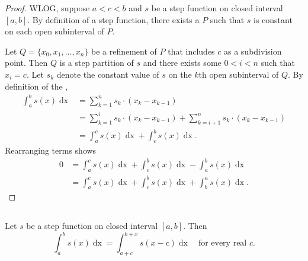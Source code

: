 \documentclass{report}
\begin{document}
  \begin{proof}
    WLOG, suppose $a < c < b$ and $s$ be a step function on closed interval
      $[a, b]$.
    By definition of a step function, there exists a 
      $P$ such that $s$ is constant on each open subinterval of $P$.

    Let $Q = \{x_0, x_1, \ldots, x_n\}$ be a refinement of $P$ that includes $c$
      as a subdivision point.
    Then $Q$ is a step partition of $s$ and there exists some $0 < i < n$ such
      that $x_i = c$.
    Let $s_k$ denote the constant value of $s$ on the $k$th open subinterval of
      $Q$.
    By definition of the ,
      \begin{align*}
        \int_a^b s(x) \mathop{dx}
          & = \sum_{k=1}^n s_k \cdot (x_k - x_{k - 1}) \\
          & = \sum_{k=1}^i s_k \cdot (x_k - x_{k - 1}) +
              \sum_{k=i+1}^n s_k \cdot (x_k - x_{k - 1}) \\
          & = \int_a^c s(x) \mathop{dx} + \int_c^b s(x) \mathop{dx}.
      \end{align*}
    Rearranging terms shows
      \begin{align*}
        0
          & = \int_a^c s(x) \mathop{dx} + \int_c^b s(x) \mathop{dx} -
              \int_a^b s(x) \mathop{dx} \\
          & = \int_a^c s(x) \mathop{dx} + \int_c^b s(x) \mathop{dx} +
              \int_b^a s(x) \mathop{dx}.
      \end{align*}
  \end{proof}

\subsection{}%

  \begin{theorem}[1.7]
    Let $s$ be a step function on closed interval $[a, b]$.
    Then
      $$\int_a^b s(x) \mathop{dx} =
        \int_{a+c}^{b+x} s(x - c) \mathop{dx} \quad\text{for every real } c.$$
  \end{theorem}
\end{document}
